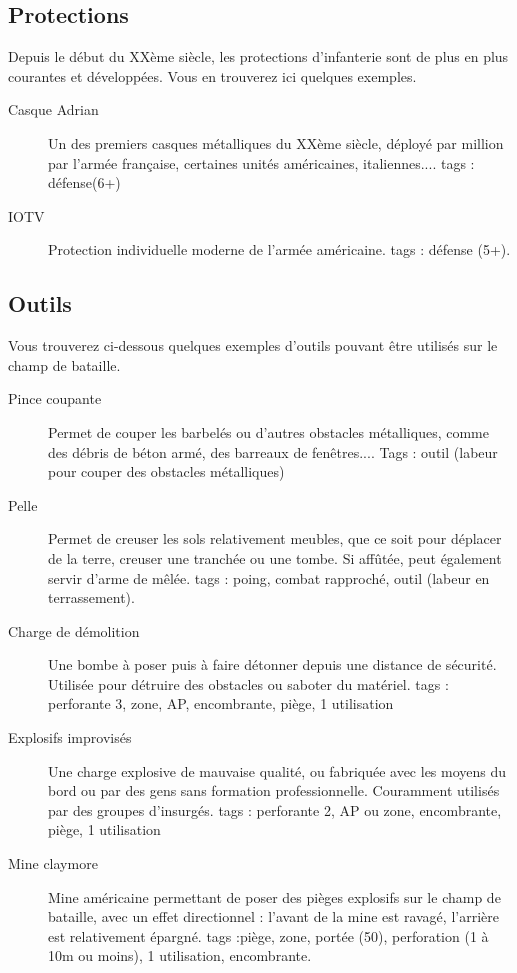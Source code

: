 \documentclass{report}
\begin{document}
\begin{multicols}{2}
\begin{description}
\end{description}
\subsection{Protections}
Depuis le début du XXème siècle, les protections d'infanterie sont de plus en plus courantes et développées. Vous en trouverez ici quelques exemples.
\begin{description}
\item[Casque Adrian]Un des premiers casques métalliques du XXème siècle, déployé par million par l'armée française, certaines unités américaines, italiennes.... tags : défense(6+)
\item[IOTV]Protection individuelle moderne de l'armée américaine. tags : défense (5+).
\end{description}
\subsection{Outils}
Vous trouverez ci-dessous quelques exemples d'outils pouvant être utilisés sur le champ de bataille.
\begin{description}
\item[Pince coupante] Permet de couper les barbelés ou d'autres obstacles métalliques, comme des débris de béton armé, des barreaux de fenêtres.... Tags : outil (labeur pour couper des obstacles métalliques)
\item[Pelle] Permet de creuser les sols relativement meubles, que ce soit pour déplacer de la terre, creuser une tranchée ou une tombe. Si affûtée, peut également servir d'arme de mêlée. tags : poing, combat rapproché, outil (labeur en terrassement).
\item[Charge de démolition]Une bombe à poser puis à faire détonner depuis une distance de sécurité. Utilisée pour détruire des obstacles ou saboter du matériel. tags : perforante 3, zone, AP, encombrante, piège, 1 utilisation
\item [Explosifs improvisés] Une charge explosive de mauvaise qualité, ou fabriquée avec les moyens du bord ou par des gens sans formation professionnelle. Couramment utilisés par des groupes d'insurgés. tags : perforante 2, AP ou zone, encombrante, piège, 1 utilisation
\item[Mine claymore] Mine américaine permettant de poser des pièges explosifs sur le champ de bataille, avec un effet directionnel : l'avant de la mine est ravagé, l'arrière est relativement épargné. tags :piège, zone, portée (50), perforation (1 à 10m ou moins), 1 utilisation, encombrante.

\end{description}
\end{multicols}
\end{document}
